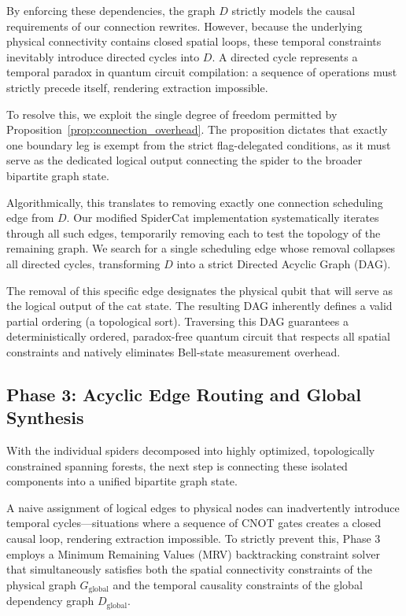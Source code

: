 \documentclass[11pt]{article}
\theoremstyle{definition}
\begin{document}
By enforcing these dependencies, the graph $D$ strictly models the causal requirements of our connection rewrites. However, because the underlying physical connectivity contains closed spatial loops, these temporal constraints inevitably introduce directed cycles into $D$. A directed cycle represents a temporal paradox in quantum circuit compilation: a sequence of operations must strictly precede itself, rendering extraction impossible.

To resolve this, we exploit the single degree of freedom permitted by Proposition~\ref{prop:connection_overhead}. The proposition dictates that exactly one boundary leg is exempt from the strict flag-delegated conditions, as it must serve as the dedicated logical output connecting the spider to the broader bipartite graph state.

Algorithmically, this translates to removing exactly one connection scheduling edge from $D$. Our modified SpiderCat implementation systematically iterates through all such edges, temporarily removing each to test the topology of the remaining graph. We search for a single scheduling edge whose removal collapses all directed cycles, transforming $D$ into a strict Directed Acyclic Graph (DAG).

The removal of this specific edge designates the physical qubit that will serve as the logical output of the cat state. The resulting DAG inherently defines a valid partial ordering (a topological sort). Traversing this DAG guarantees a deterministically ordered, paradox-free quantum circuit that respects all spatial constraints and natively eliminates Bell-state measurement overhead.

\subsection{Phase 3: Acyclic Edge Routing and Global Synthesis}
With the individual spiders decomposed into highly optimized, topologically constrained spanning forests, the next step is connecting these isolated components into a unified bipartite graph state.

A naive assignment of logical edges to physical nodes can inadvertently introduce temporal cycles—situations where a sequence of CNOT gates creates a closed causal loop, rendering extraction impossible. To strictly prevent this, Phase 3 employs a Minimum Remaining Values (MRV) backtracking constraint solver that simultaneously satisfies both the spatial connectivity constraints of the physical graph $G_{\text{global}}$ and the temporal causality constraints of the global dependency graph $D_{\text{global}}$.
\end{document}
